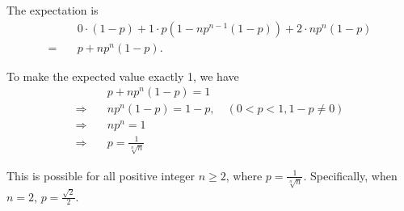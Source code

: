 \documentclass[11pt, oneside]{article}   	%
\begin{document}
 The expectation is
 \begin{align*}
& 0\cdot(1-p) +1\cdot p(1-n p^{n-1}(1-p)) +2\cdot n p^n (1-p)\\
= \quad & p + np^n (1-p).
 \end{align*}
 
 To make the expected value exactly 1, we have
 \begin{align*}
 &p + np^n (1-p)=1\\
 \Rightarrow \quad &np^n(1-p)=1-p, \quad (0<p<1, 1-p \ne 0)\\
 \Rightarrow \quad &np^n=1\\
 \Rightarrow \quad &p=\frac{1}{\sqrt[n]{n}}
 \end{align*}
 
 This is possible for all positive integer $n\ge 2$, where $p=\frac{1}{\sqrt[n]{n}}$. Specifically, when $n=2$, $p=\frac{\sqrt{2}}{2}$.
 
 
 
\end{document}

